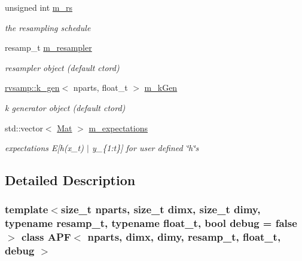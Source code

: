 \begin{DoxyCompactItemize}
\mbox{\label{classAPF_aad8474f0b0bcff903159d089a1ff6034}} 
unsigned int \hyperlink{classAPF_aad8474f0b0bcff903159d089a1ff6034}{m\+\_\+rs}
\begin{DoxyCompactList}\small\item\em the resampling schedule \end{DoxyCompactList}\item 
\mbox{\label{classAPF_abe197fa40194365d3838949342ccb92f}} 
resamp\+\_\+t \hyperlink{classAPF_abe197fa40194365d3838949342ccb92f}{m\+\_\+resampler}
\begin{DoxyCompactList}\small\item\em resampler object (default ctor\textquotesingle{}d) \end{DoxyCompactList}\item 
\mbox{\label{classAPF_a33a0e3338fe63dda61e7a1f4e3aba3c9}} 
\hyperlink{classrvsamp_1_1k__gen}{rvsamp\+::k\+\_\+gen}$<$ nparts, float\+\_\+t $>$ \hyperlink{classAPF_a33a0e3338fe63dda61e7a1f4e3aba3c9}{m\+\_\+k\+Gen}
\begin{DoxyCompactList}\small\item\em k generator object (default ctor\textquotesingle{}d) \end{DoxyCompactList}\item 
\mbox{\label{classAPF_ae2020932c16ac9e06a5236d1d32512a1}} 
std\+::vector$<$ \hyperlink{classAPF_ac241705f732b7e0a0bc1a3bc518a92d2}{Mat} $>$ \hyperlink{classAPF_ae2020932c16ac9e06a5236d1d32512a1}{m\+\_\+expectations}
\begin{DoxyCompactList}\small\item\em expectations E\mbox{[}h(x\+\_\+t) $\vert$ y\+\_\+\{1\+:t\}\mbox{]} for user defined \char`\"{}h\char`\"{}s \end{DoxyCompactList}\end{DoxyCompactItemize}


\subsection{Detailed Description}
\subsubsection*{template$<$size\+\_\+t nparts, size\+\_\+t dimx, size\+\_\+t dimy, typename resamp\+\_\+t, typename float\+\_\+t, bool debug = false$>$\newline
class A\+P\+F$<$ nparts, dimx, dimy, resamp\+\_\+t, float\+\_\+t, debug $>$}

